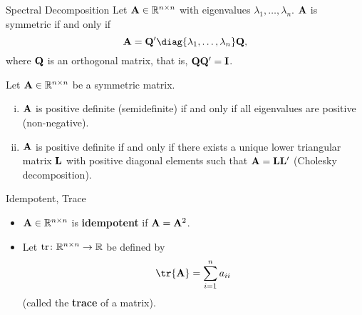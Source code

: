\begin{Theorem}{Spectral Decomposition}{}
    Let $ \mathbf{A}\in\mathbb{R}^{n\times n} $ with eigenvalues $ \lambda_1,\ldots,\lambda_n $. $ \mathbf{A} $ is symmetric if and only if
    \[ \Matrix{A}=\Matrix{Q}'\diag{\lambda_1,\ldots,\lambda_n}\Matrix{Q}, \]
    where $ \mathbf{Q} $ is an orthogonal matrix, that is, $ \mathbf{Q}\mathbf{Q}'=\mathbf{I} $.
\end{Theorem}
\begin{Theorem}{}{}
    Let $ \mathbf{A}\in\mathbb{R}^{n\times n} $ be a symmetric matrix.
    \begin{enumerate}[(i)]
        \item $ \mathbf{A} $ is positive definite (semidefinite) if and only if all eigenvalues are positive (non-negative).
        \item $ \mathbf{A} $ is positive definite if and only if there exists a unique lower triangular matrix $ \mathbf{L} $
              with positive diagonal elements such that $ \mathbf{A}=\mathbf{L}\mathbf{L}' $ (Cholesky decomposition).
    \end{enumerate}
\end{Theorem}
\begin{Definition}{Idempotent, Trace}{}
    \begin{itemize}
        \item $ \mathbf{A}\in\mathbb{R}^{n\times n} $ is \textbf{idempotent} if $ \mathbf{A}=\mathbf{A}^2 $.
        \item Let $ \text{tr}\colon\mathbb{R}^{n\times n}\to\mathbb{R} $ be defined by
              \[ \tr{\Matrix{A}}=\sum_{i=1}^{n}a_{ii} \]
              (called the \textbf{trace} of a matrix).
    \end{itemize}
\end{Definition}
